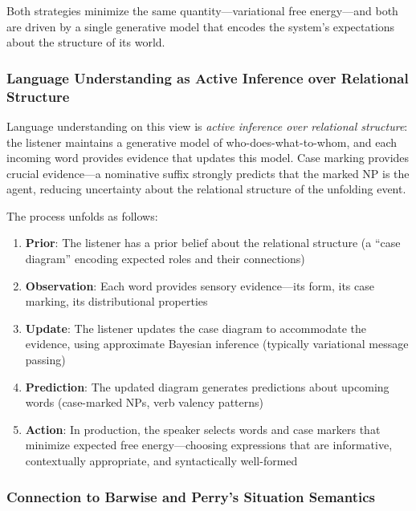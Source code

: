 \documentclass[
]{article}
\providecommand{\tightlist}{%
  \setlength{\itemsep}{0pt}\setlength{\parskip}{0pt}}
\numberwithin{equation}{section}
\begin{document}
Both strategies minimize the same quantity---variational free
energy---and both are driven by a single generative model that encodes
the system's expectations about the structure of its world.

\subsubsection{Language Understanding as Active Inference over
Relational
Structure}\label{language-understanding-as-active-inference-over-relational-structure}

Language understanding on this view is \emph{active inference over
relational structure}: the listener maintains a generative model of
who-does-what-to-whom, and each incoming word provides evidence that
updates this model. Case marking provides crucial evidence---a
nominative suffix strongly predicts that the marked NP is the agent,
reducing uncertainty about the relational structure of the unfolding
event.

The process unfolds as follows:

\begin{enumerate}
\def\labelenumi{\arabic{enumi}.}
\tightlist
\item
  \textbf{Prior}: The listener has a prior belief about the relational
  structure (a ``case diagram'' encoding expected roles and their
  connections)
\item
  \textbf{Observation}: Each word provides sensory evidence---its form,
  its case marking, its distributional properties
\item
  \textbf{Update}: The listener updates the case diagram to accommodate
  the evidence, using approximate Bayesian inference (typically
  variational message passing)
\item
  \textbf{Prediction}: The updated diagram generates predictions about
  upcoming words (case-marked NPs, verb valency patterns)
\item
  \textbf{Action}: In production, the speaker selects words and case
  markers that minimize expected free energy---choosing expressions that
  are informative, contextually appropriate, and syntactically
  well-formed
\end{enumerate}

\subsubsection{Connection to Barwise and Perry's Situation
Semantics}\label{connection-to-barwise-and-perrys-situation-semantics}
\end{document}
